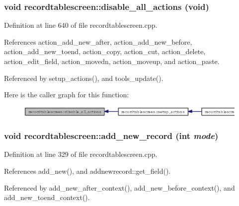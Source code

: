 \subsubsection{\setlength{\rightskip}{0pt plus 5cm}void recordtablescreen::disable\_\-all\_\-actions (void)\hspace{0.3cm}{\tt  [private]}}\label{classrecordtablescreen_29e17faab1f97b595f897d80c287f92d}




Definition at line 640 of file recordtablescreen.cpp.

References action\_\-add\_\-new\_\-after, action\_\-add\_\-new\_\-before, action\_\-add\_\-new\_\-toend, action\_\-copy, action\_\-cut, action\_\-delete, action\_\-edit\_\-field, action\_\-movedn, action\_\-moveup, and action\_\-paste.

Referenced by setup\_\-actions(), and tools\_\-update().

Here is the caller graph for this function:\begin{figure}[H]
\begin{center}
\leavevmode
\includegraphics[width=359pt]{classrecordtablescreen_29e17faab1f97b595f897d80c287f92d_icgraph}
\end{center}
\end{figure}
\subsubsection{\setlength{\rightskip}{0pt plus 5cm}void recordtablescreen::add\_\-new\_\-record (int {\em mode})\hspace{0.3cm}{\tt  [private]}}\label{classrecordtablescreen_e52ce4d7625ab4d1a78938b3028652be}




Definition at line 329 of file recordtablescreen.cpp.

References add\_\-new(), and addnewrecord::get\_\-field().

Referenced by add\_\-new\_\-after\_\-context(), add\_\-new\_\-before\_\-context(), and add\_\-new\_\-toend\_\-context().

